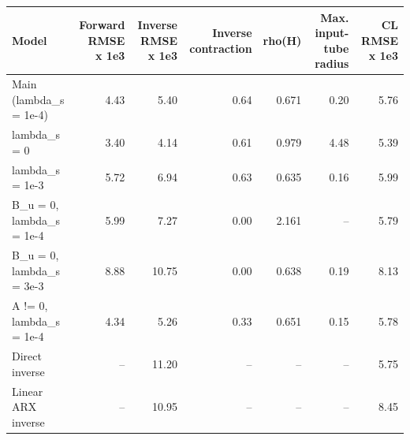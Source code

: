 \begin{tabular}{lrrrrrr}
\toprule
Model & Forward RMSE x 1e3 & Inverse RMSE x 1e3 & Inverse contraction & rho(H) & Max. input-tube radius & CL RMSE x 1e3 \\
\midrule
Main (lambda\_s = 1e-4) & 4.43 & 5.40 & 0.64 & 0.671 & 0.20 & 5.76 \\
lambda\_s = 0 & 3.40 & 4.14 & 0.61 & 0.979 & 4.48 & 5.39 \\
lambda\_s = 1e-3 & 5.72 & 6.94 & 0.63 & 0.635 & 0.16 & 5.99 \\
B\_u = 0, lambda\_s = 1e-4 & 5.99 & 7.27 & 0.00 & 2.161 & -- & 5.79 \\
B\_u = 0, lambda\_s = 3e-3 & 8.88 & 10.75 & 0.00 & 0.638 & 0.19 & 8.13 \\
A != 0, lambda\_s = 1e-4 & 4.34 & 5.26 & 0.33 & 0.651 & 0.15 & 5.78 \\
Direct inverse & -- & 11.20 & -- & -- & -- & 5.75 \\
Linear ARX inverse & -- & 10.95 & -- & -- & -- & 8.45 \\
\bottomrule
\end{tabular}
